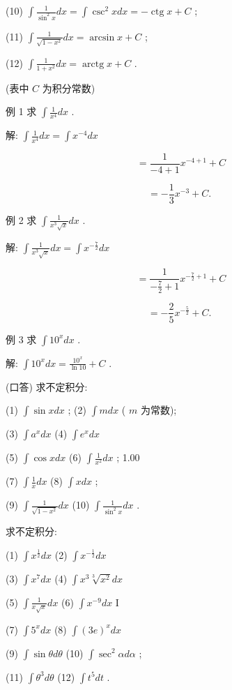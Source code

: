 \documentclass[lang=cn,newtx,10pt,scheme=chinese]{elegantbook}
\begin{document}
(10) \(\int \frac{1}{{\sin }^{2}x}{dx} = \int {\csc }^{2}{xdx} = - \operatorname{ctg}x + C\) ;

(11) \(\int \frac{1}{\sqrt{1 - {x}^{2}}}{dx} = \arcsin x + C\) ;

(12) \(\int \frac{1}{1 + {x}^{2}}{dx} = \operatorname{arctg}x + C\) .

(表中 \(C\) 为积分常数)

例 1 求 \(\int \frac{1}{{x}^{4}}{dx}\) .

解: \(\int \frac{1}{{x}^{4}}{dx} = \int {x}^{-4}{dx}\)

\[
= \frac{1}{-4 + 1}{x}^{-4 + 1} + C
\]

\[
= - \frac{1}{3}{x}^{-3} + C\text{. }
\]

例 2 求 \(\int \frac{1}{{x}^{3}\sqrt{x}}{dx}\) .

解: \(\int \frac{1}{{x}^{3}\sqrt{x}}{dx} = \int {x}^{-\frac{7}{2}}{dx}\)

\[
= \frac{1}{-\frac{7}{2} + 1}{x}^{-\frac{7}{2} + 1} + C
\]

\[
= - \frac{2}{5}{x}^{-\frac{5}{2}} + C\text{. }
\]

例 3 求 \(\int {10}^{x}{dx}\) .

解: \(\int {10}^{x}{dx} = \frac{{10}^{x}}{\ln {10}} + C\) .

\begin{problemset}[练习]

\item (口答) 求不定积分:

(1) \(\int \sin {xdx}\) ; (2) \(\int {mdx}\) ( \(m\) 为常数);

(3) \(\int {a}^{x}{dx}\) (4) \(\int {e}^{x}{dx}\)

(5) \(\int \cos {xdx}\) (6) \(\int \frac{1}{{x}^{2}}{dx}\) ; 1.00

(7) \(\int \frac{1}{x}{dx}\) (8) \(\int {xdx}\) ;

(9) \(\int \frac{1}{\sqrt{1 - {x}^{2}}}{dx}\) (10) \(\int \frac{1}{{\sin }^{2}x}{dx}\) .

\item 求不定积分:

(1) \(\int {x}^{\frac{1}{2}}{dx}\) (2) \(\int {x}^{-\frac{1}{2}}{dx}\)

(3) \(\int {x}^{7}{dx}\) (4) \(\int {x}^{3}\sqrt[3]{{x}^{2}}{dx}\)

(5) \(\int \frac{1}{x\sqrt{x}}{dx}\) (6) \(\int {x}^{-9}{dx}\) I

(7) \(\int {5}^{x}{dx}\) (8) \(\int {\left( 3e\right) }^{x}{dx}\)

(9) \(\int \sin {\theta d\theta }\) (10) \(\int {\sec }^{2}{\alpha d\alpha }\) ;

(11) \(\int {\theta }^{3}{d\theta }\) (12) \(\int {t}^{5}{dt}\) .

\end{problemset}
\end{document}
